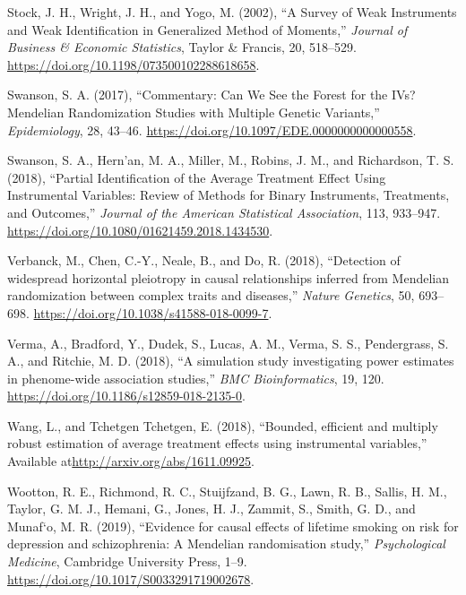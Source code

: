 \documentclass[
]{article}
\theoremstyle{plain}
\begin{document}
\leavevmode\hypertarget{ref-stock_survey_2002}{}%
Stock, J. H., Wright, J. H., and Yogo, M. (2002), ``A Survey of Weak Instruments and Weak Identification in Generalized Method of Moments,'' \emph{Journal of Business \& Economic Statistics}, Taylor \& Francis, 20, 518--529. \url{https://doi.org/10.1198/073500102288618658}.

\leavevmode\hypertarget{ref-swanson_commentary_2017}{}%
Swanson, S. A. (2017), ``Commentary: Can We See the Forest for the IVs? Mendelian Randomization Studies with Multiple Genetic Variants,'' \emph{Epidemiology}, 28, 43--46. \url{https://doi.org/10.1097/EDE.0000000000000558}.

\leavevmode\hypertarget{ref-swanson_partial_2018}{}%
Swanson, S. A., Hern\a'an, M. A., Miller, M., Robins, J. M., and Richardson, T. S. (2018), ``Partial Identification of the Average Treatment Effect Using Instrumental Variables: Review of Methods for Binary Instruments, Treatments, and Outcomes,'' \emph{Journal of the American Statistical Association}, 113, 933--947. \url{https://doi.org/10.1080/01621459.2018.1434530}.

\leavevmode\hypertarget{ref-verbanck_detection_2018}{}%
Verbanck, M., Chen, C.-Y., Neale, B., and Do, R. (2018), ``Detection of widespread horizontal pleiotropy in causal relationships inferred from Mendelian randomization between complex traits and diseases,'' \emph{Nature Genetics}, 50, 693--698. \url{https://doi.org/10.1038/s41588-018-0099-7}.

\leavevmode\hypertarget{ref-verma_simulation_2018}{}%
Verma, A., Bradford, Y., Dudek, S., Lucas, A. M., Verma, S. S., Pendergrass, S. A., and Ritchie, M. D. (2018), ``A simulation study investigating power estimates in phenome-wide association studies,'' \emph{BMC Bioinformatics}, 19, 120. \url{https://doi.org/10.1186/s12859-018-2135-0}.

\leavevmode\hypertarget{ref-wang_bounded_2018}{}%
Wang, L., and Tchetgen Tchetgen, E. (2018), ``Bounded, efficient and multiply robust estimation of average treatment effects using instrumental variables,'' Available at\url{http://arxiv.org/abs/1611.09925}.

\leavevmode\hypertarget{ref-wootton_evidence_2019}{}%
Wootton, R. E., Richmond, R. C., Stuijfzand, B. G., Lawn, R. B., Sallis, H. M., Taylor, G. M. J., Hemani, G., Jones, H. J., Zammit, S., Smith, G. D., and Munaf\a`o, M. R. (2019), ``Evidence for causal effects of lifetime smoking on risk for depression and schizophrenia: A Mendelian randomisation study,'' \emph{Psychological Medicine}, Cambridge University Press, 1--9. \url{https://doi.org/10.1017/S0033291719002678}.
\end{document}
